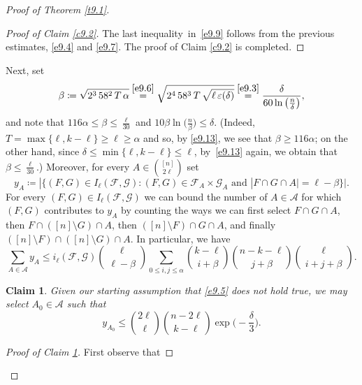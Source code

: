 \documentclass[10pt]{amsart}
\newtheorem{claim}[thm]{Claim}
\theoremstyle{remark}
\newcommand{\ee}{\varepsilon}
\newcommand{\meg}{\geqslant}
\newcommand{\mik}{\leqslant}
\newcommand{\Fcal}{\mathcal{F}}
\newcommand{\Gcal}{\mathcal{G}}
\newcommand{\Acal}{\mathcal{A}}
\begin{document}
\begin{proof}[Proof of Theorem \emph{\ref{t9.1}}]
\begin{proof}[Proof of Claim \emph{\ref{c9.2}}]
The last inequality~in~\eqref{e9.9} follows from the previous estimates, \eqref{e9.4} and \eqref{e9.7}.
The proof of Claim \ref{c9.2} is completed.
\end{proof}
Next, set
\begin{equation} \label{e9.13}
\beta\coloneqq \sqrt{2^3\, 58^2\, T\,\alpha} \stackrel{\eqref{e9.6}}{=}
\sqrt{2^4\,58^3\, T\, \sqrt{\ell\, \ee(\delta)}} \stackrel{\eqref{e9.3}}{=}
\frac{\delta}{60\ln\big(\frac{n}{\delta}\big)},
\end{equation}
and note that $116\alpha \mik\beta\mik\frac{\ell}{30}$ and $10\beta\ln\big(\frac{n}{\beta}\big)\mik\delta$.
(Indeed, $T=\max\{\ell,k-\ell\}\meg \ell\meg\alpha$ and so, by \eqref{e9.13}, we see that
$\beta\meg 116\alpha$; on the other hand, since $\delta\mik \min\{\ell,k-\ell\}\mik \ell$,
by~\eqref{e9.13} again, we obtain that $\beta\mik \frac{\ell}{30}$.) Moreover, for every $A\in\binom{[n]}{2\ell}$ set
\begin{equation} \label{e9.14}
y_{A}\coloneqq |\{(F,G)\in I_{\ell}(\Fcal,\Gcal):(F,G)\in\Fcal_{A}\times\Gcal_{A}
\text{ and } |F\cap G \cap A|=\ell-\beta\}|.
\end{equation}
For every $(F,G)\in I_{\ell}(\Fcal,\Gcal)$ we can bound the number of $A\in\Acal$ for which $(F,G)$ contributes to $y_A$ by counting the ways we can first select $F\cap G \cap A$, then $F\cap([n]\setminus G)\cap A$, then $([n]\setminus F)\cap G\cap A$, and finally $([n]\setminus F)\cap ([n]\setminus G)\cap A$. In particular, we have
\begin{equation} \label{e9.15}
\sum_{A\in\Acal} y_{A} \mik i_{\ell}(\Fcal,\Gcal) \binom{\ell}{\ell-\beta}
\sum_{0\mik i, j\mik \alpha} \binom{k-\ell}{i+\beta} \binom{n-k-\ell}{j+\beta} \binom{\ell}{i+j+\beta}.
\end{equation}
\begin{claim} \label{cl-8-new}
Given our starting assumption that \eqref{e9.5} does not hold true, we may select $A_0\in\Acal$ such that
\begin{equation} \label{e9.16}
y_{A_0} \mik
\binom{2\ell}{\ell}\binom{n-2\ell}{k-\ell} \exp\Big(-\frac{\delta}{3}\Big).
\end{equation}
\end{claim}
\begin{proof}[Proof of Claim \emph{\ref{cl-8-new}}]
First observe that
\end{proof}
\end{proof}
\end{document}
